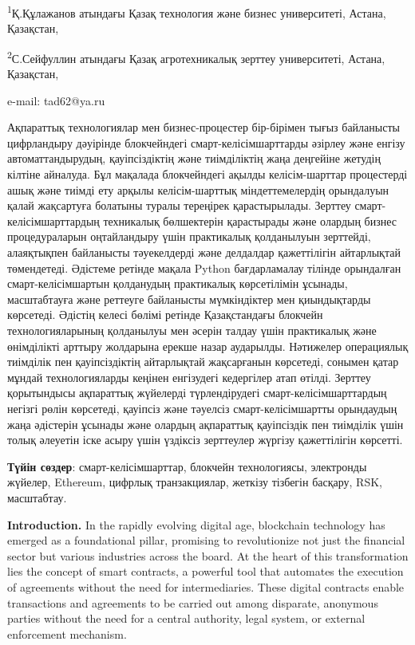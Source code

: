 \textsuperscript{1}Қ.Құлажанов атындағы Қазақ технология және бизнес
университеті, Астана, Қазақстан,

\textsuperscript{2}С.Сейфуллин атындағы Қазақ агротехникалық зерттеу
университеті, Астана, Қазақстан,

e-mail: tad62@ya.ru

Ақпараттық технологиялар мен бизнес-процестер бір-бірімен тығыз
байланысты цифрландыру дәуірінде блокчейндегі смарт-келісімшарттарды
әзірлеу және енгізу автоматтандырудың, қауіпсіздіктің және тиімділіктің
жаңа деңгейіне жетудің кілтіне айналуда. Бұл мақалада блокчейндегі
ақылды келісім-шарттар процестерді ашық және тиімді ету арқылы
келісім-шарттық міндеттемелердің орындалуын қалай жақсартуға болатыны
туралы тереңірек қарастырылады. Зерттеу смарт-келісімшарттардың
техникалық бөлшектерін қарастырады және олардың бизнес процедураларын
оңтайландыру үшін практикалық қолданылуын зерттейді, алаяқтықпен
байланысты тәуекелдерді және делдалдар қажеттілігін айтарлықтай
төмендетеді. Әдістеме ретінде мақала Python бағдарламалау тілінде
орындалған смарт-келісімшартын қолданудың практикалық көрсетілімін
ұсынады, масштабтауға және реттеуге байланысты мүмкіндіктер мен
қиындықтарды көрсетеді. Әдістің келесі бөлімі ретінде Қазақстандағы
блокчейн технологияларының қолданылуы мен әсерін талдау үшін практикалық
және өнімділікті арттыру жолдарына ерекше назар аударылды. Нәтижелер
операциялық тиімділік пен қауіпсіздіктің айтарлықтай жақсарғанын
көрсетеді, сонымен қатар мұндай технологияларды кеңінен енгізудегі
кедергілер атап өтілді. Зерттеу қорытындысы ақпараттық жүйелерді
түрлендірудегі смарт-келісімшарттардың негізгі рөлін көрсетеді, қауіпсіз
және тәуелсіз смарт-келісімшартты орындаудың жаңа әдістерін ұсынады және
олардың ақпараттық қауіпсіздік пен тиімділік үшін толық әлеуетін іске
асыру үшін үздіксіз зерттеулер жүргізу қажеттілігін көрсетті.

\textbf{Түйін сөздер}: смарт-келісімшарттар, блокчейн технологиясы,
электронды жүйелер, Ethereum, цифрлық транзакциялар, жеткізу тізбегін
басқару, RSK, масштабтау.

\textbf{Introduction.} In the rapidly evolving digital age, blockchain
technology has emerged as a foundational pillar, promising to
revolutionize not just the financial sector but various industries
across the board. At the heart of this transformation lies the concept
of smart contracts, a powerful tool that automates the execution of
agreements without the need for intermediaries. These digital contracts
enable transactions and agreements to be carried out among disparate,
anonymous parties without the need for a central authority, legal
system, or external enforcement mechanism.

